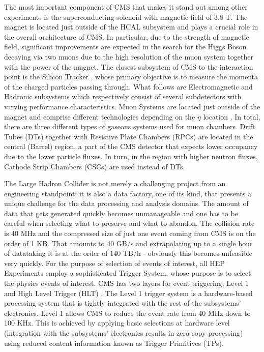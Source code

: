 The most important component of CMS that makes it stand out among other experiments is the superconducting solenoid with magnetic field of 3.8 T. The magnet is located just outside of the HCAL subsystem and plays a crucial role in the overall architecture of CMS. In particular, due to the strength of magnetic field, significant improvements are expected in the search for the Higgs Boson decaying via two muons due to the high resolution of the muon system together with the power of the magnet. The closest subsystem of CMS to the interaction point is the Silicon Tracker \cite{Tracker}, whose primary objective is to measure the momenta of the charged particles passing through. What follows are Electromagnetic \cite{ECAL} and Hadronic \cite{HCAL} subsystems which respectively consist of several subdetectors with varying performance characteristics. Muon Systems are located just outside of the magnet and comprise different technologies depending on the $\eta$ location \cite{Muon}. In total, there are three different types of gaseous systems used for muon chambers. Drift Tubes (DTs) together with Resistive Plate Chambers (RPCs) are located in the central (Barrel) region, a part of the CMS detector that expects lower occupancy due to the lower particle fluxes. In turn, in the region with higher neutron fluxes, Cathode Strip Chambers (CSCs) are used instead of DTs.

The Large Hadron Collider is not merely a challenging project from an engineering standpoint; it is also a data factory, one of its kind, that presents a unique challenge for the data processing and analysis domains. The amount of data that gets generated quickly becomes unmanageable and one has to be careful when selecting what to preserve and what to abandon. The collision rate is 40 MHz and the compressed size of just one event coming from CMS is on the order of 1 KB. That amounts to 40 GB/s and extrapolating up to a single hour of datataking it is at the order of 140 TB/h - obviously this becomes unfeasible very quickly. For the purpose of selection of events of interest, all HEP Experiments employ a sophisticated Trigger System, whose purpose is to select the physics events of interest. CMS has two layers for event triggering: Level 1 \cite{L1Trigger} and High Level Trigger (HLT) \cite{HLTrigger}. The Level 1 trigger system is a hardware-based processing system that is tightly integrated with the rest of the subsystems' electronics. Level 1 allows CMS to reduce the event rate from 40 MHz down to 100 KHz. This is achieved by applying basic selections at hardware level (integration with the subsystems' electronics results in zero copy processing) using reduced content information known as Trigger Primitives (TPs).

